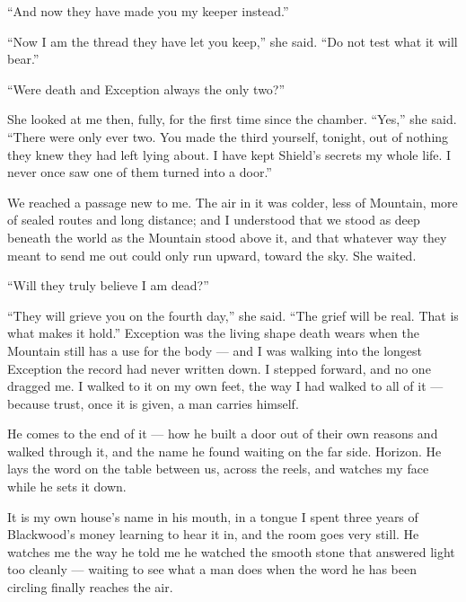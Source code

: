 ``And now they have made you my keeper instead.''\par

``Now I am the thread they have let you keep,'' she said. ``Do not test what it will bear.''\par

``Were death and Exception always the only two?''\par

She looked at me then, fully, for the first time since the chamber. ``Yes,'' she said. ``There were only ever two. You made the third yourself, tonight, out of nothing they knew they had left lying about. I have kept Shield's secrets my whole life. I never once saw one of them turned into a door.''\par

We reached a passage new to me. The air in it was colder, less of Mountain, more of sealed routes and long distance; and I understood that we stood as deep beneath the world as the Mountain stood above it, and that whatever way they meant to send me out could only run upward, toward the sky. She waited.\par

``Will they truly believe I am dead?''\par

``They will grieve you on the fourth day,'' she said. ``The grief will be real. That is what makes it hold.'' Exception was the living shape death wears when the Mountain still has a use for the body --- and I was walking into the longest Exception the record had never written down. I stepped forward, and no one dragged me. I walked to it on my own feet, the way I had walked to all of it --- because trust, once it is given, a man carries himself.\par

\ornament

He comes to the end of it --- how he built a door out of their own reasons and walked through it, and the name he found waiting on the far side. Horizon. He lays the word on the table between us, across the reels, and watches my face while he sets it down.\par
 
It is my own house's name in his mouth, in a tongue I spent three years of Blackwood's money learning to hear it in, and the room goes very still. He watches me the way he told me he watched the smooth stone that answered light too cleanly --- waiting to see what a man does when the word he has been circling finally reaches the air.\par
 
